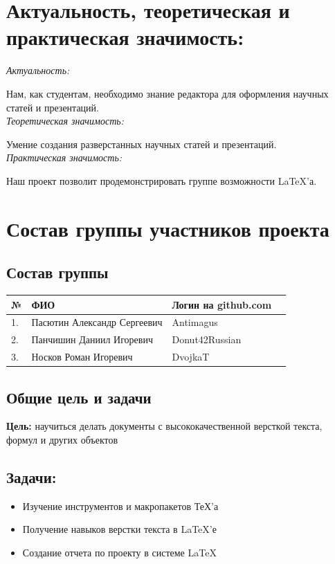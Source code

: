 \documentclass{article}
\begin{document}
	\section*{Актуальность, теоретическая и практическая значимость:}
	
	
	\noindent\emph{Актуальность:}
	
	
	\noindent Нам, как студентам, необходимо знание редактора для оформления научных статей и презентаций.\\
	
	
	\noindent\emph{Теоретическая значимость:}
	
	
	\noindent Умение создания разверстанных научных статей и презентаций.\\
	
	
	\noindent\emph{Практическая значимость:}
	
	
	\noindent Наш проект позволит продемонстрировать группе возможности LaTeX’а.
	
\section{Состав группы участников проекта}
\subsection*{Состав группы}
\begin{tabular}{| l | l | l |p{5cm}|}
\hline
№ & ФИО & Логин на github.com \\
\hline
1. & Пасютин Александр Сергеевич & Antimagus \\
\hline
2. & Панчишин Даниил Игоревич & Donut42Russian \\
\hline
3. & Носков Роман Игоревич & DvojkaT \\
\hline
\end{tabular}
\subsection*{Общие цель и задачи}
\noindent\textbf{Цель:} научиться делать документы с высококачественной версткой текста, формул и других объектов

\subsection*{Задачи:}
\begin{itemize}
	\item Изучение инструментов и макропакетов ТеХ'а
	
	\item Получение навыков верстки текста в LaTeX’е
	
	\item Создание отчета по проекту в системе LaTeX
\end{itemize}
\end{document}
